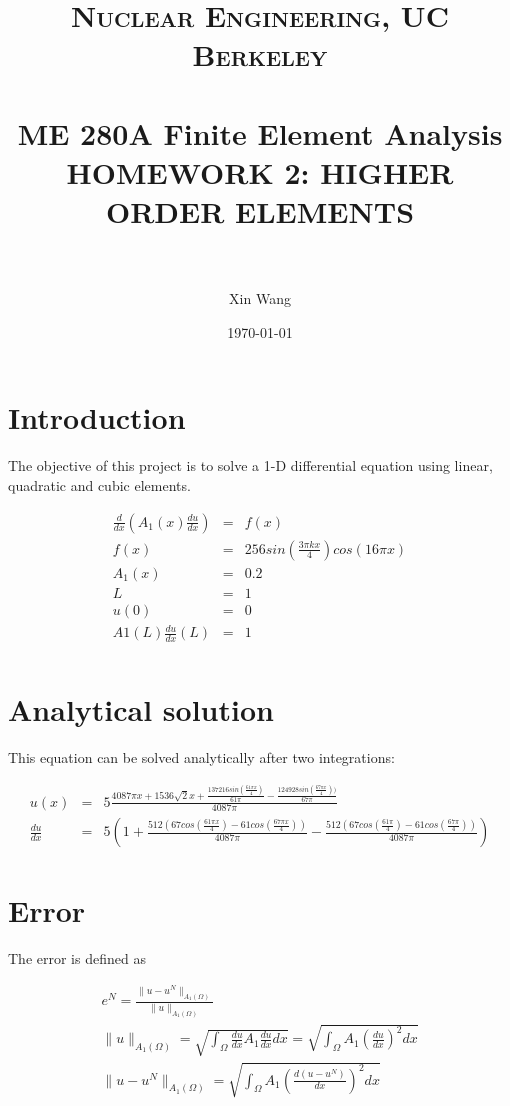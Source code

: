 \documentclass[paper=a4, fontsize=11pt]{article} %
\title{	
\normalfont \normalsize 
\textsc{Nuclear Engineering, UC Berkeley} \\ [25pt] %
\horrule{0.5pt} \\[0.4cm] %
\huge ME 280A Finite Element Analysis \\HOMEWORK 2: HIGHER ORDER ELEMENTS  \\  %
\horrule{2pt} \\[0.5cm] %
}
\author{Xin Wang} %
\date{\normalsize\today} %
\begin{document}
\maketitle %

\newpage
\section{Introduction}
The objective of this project is to solve a 1-D differential equation using linear, quadratic and cubic elements. 

\begin{eqnarray}
\frac{d}{dx}(A_1(x) \frac{du}{dx}) &=& f(x)\nonumber\\
f(x)&=&256sin(\frac{3\pi kx}{4})cos(16 \pi x) \nonumber\\
A_1(x)& = &0.2 \nonumber\\
L&=&1 \nonumber\\
u(0)& =& 0 \nonumber\\
A1(L)\frac{du}{dx}(L) &=& 1 \nonumber\\
\end{eqnarray}


\section{Analytical solution}
This equation can be solved analytically after two integrations:

\begin{eqnarray}
u(x)&=& 5\frac{4087\pi x + 1536\sqrt{2}x + \frac{137216sin(\frac{61\pi x}{4})}{61\pi}- \frac{124928sin(\frac{67\pi x}{4}))}{67\pi}}{4087\pi}\nonumber\\
\frac{du}{dx}&=& 5(1+ \frac{512(67cos(\frac{61\pi x}{4})- 61cos(\frac{67\pi x}{4}))}{4087\pi} - \frac{512(67cos(\frac{61\pi }{4})- 61cos(\frac{67\pi}{4}))}{4087\pi})
\end{eqnarray}


\section{Error}
The error is defined as 

\begin{eqnarray}
e^N = \frac{\| u -u^N \| _{A_1(\Omega)}} {\| u \| _{A_1 (\Omega)}} \nonumber\\
\| u \| _{A_1 (\Omega)} = \sqrt{\int_{\Omega} \frac{du}{dx} A_1 \frac{du}{dx} dx} = \sqrt{\int_{\Omega} A_1(\frac{du}{dx})^2 dx}\nonumber\\
\| u -u^N \| _{A_1(\Omega)} = \sqrt{\int_{\Omega} A_1 (\frac{d(u-u^N)}{dx})^2 dx}
\end{eqnarray}
\end{document}
